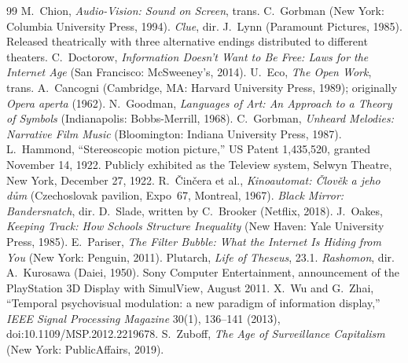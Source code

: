 \begin{thebibliography}{99}
 M.~Chion, \emph{Audio-Vision: Sound on Screen}, trans. C.~Gorbman (New York: Columbia University Press, 1994).
 \emph{Clue}, dir. J.~Lynn (Paramount Pictures, 1985). Released theatrically with three alternative endings distributed to different theaters.
 C.~Doctorow, \emph{Information Doesn't Want to Be Free: Laws for the Internet Age} (San Francisco: McSweeney's, 2014).
 U.~Eco, \emph{The Open Work}, trans. A.~Cancogni (Cambridge, MA: Harvard University Press, 1989); originally \emph{Opera aperta} (1962).
 N.~Goodman, \emph{Languages of Art: An Approach to a Theory of Symbols} (Indianapolis: Bobbs-Merrill, 1968).
 C.~Gorbman, \emph{Unheard Melodies: Narrative Film Music} (Bloomington: Indiana University Press, 1987).
 L.~Hammond, ``Stereoscopic motion picture,'' US Patent 1,435,520, granted November 14, 1922. Publicly exhibited as the Teleview system, Selwyn Theatre, New York, December 27, 1922.
 R.~Činčera et al., \emph{Kinoautomat: Člověk a jeho dům} (Czechoslovak pavilion, Expo~67, Montreal, 1967).
 \emph{Black Mirror: Bandersnatch}, dir. D.~Slade, written by C.~Brooker (Netflix, 2018).
 J.~Oakes, \emph{Keeping Track: How Schools Structure Inequality} (New Haven: Yale University Press, 1985).
 E.~Pariser, \emph{The Filter Bubble: What the Internet Is Hiding from You} (New York: Penguin, 2011).
 Plutarch, \emph{Life of Theseus}, 23.1.
 \emph{Rashomon}, dir. A.~Kurosawa (Daiei, 1950).
 Sony Computer Entertainment, announcement of the PlayStation 3D Display with SimulView, August 2011.
 X.~Wu and G.~Zhai, ``Temporal psychovisual modulation: a new paradigm of information display,'' \emph{IEEE Signal Processing Magazine} 30(1), 136--141 (2013), doi:10.1109/MSP.2012.2219678.
 S.~Zuboff, \emph{The Age of Surveillance Capitalism} (New York: PublicAffairs, 2019).
\end{thebibliography}
